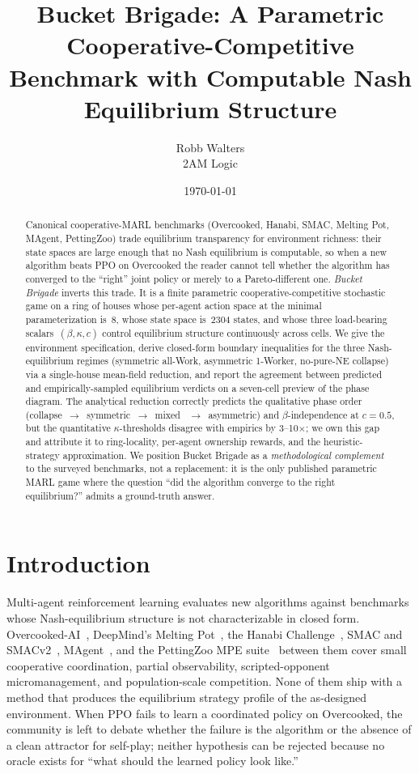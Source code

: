 \documentclass{anvil-paper}
\title{Bucket Brigade: A Parametric Cooperative-Competitive Benchmark with
Computable Nash Equilibrium Structure}
\author{Robb Walters \\ 2AM Logic}
\date{\today}
\begin{document}
\maketitle

\begin{abstract}
Canonical cooperative-MARL benchmarks (Overcooked, Hanabi, SMAC, Melting Pot,
MAgent, PettingZoo) trade equilibrium transparency for environment richness:
their state spaces are large enough that no Nash equilibrium is computable, so
when a new algorithm beats PPO on Overcooked the reader cannot tell whether
the algorithm has converged to the ``right'' joint policy or merely to a
Pareto-different one. \emph{Bucket Brigade} inverts this trade. It is a finite
parametric cooperative-competitive stochastic game on a ring of houses whose
per-agent action space at the minimal parameterization is~$8$, whose state
space is~$2304$ states, and whose three load-bearing scalars~$(\beta,\kappa,c)$
control equilibrium structure continuously across cells. We give the
environment specification, derive closed-form boundary inequalities for the
three Nash-equilibrium regimes (symmetric all-Work, asymmetric 1-Worker,
no-pure-NE collapse) via a single-house mean-field reduction, and report the
agreement between predicted and empirically-sampled equilibrium verdicts on a
seven-cell preview of the phase diagram. The analytical reduction correctly
predicts the qualitative phase order (collapse~$\to$~symmetric~$\to$~mixed
~$\to$~asymmetric) and $\beta$-independence at $c{=}0.5$, but the quantitative
$\kappa$-thresholds disagree with empirics by 3--10$\times$; we own this gap
and attribute it to ring-locality, per-agent ownership rewards, and the
heuristic-strategy approximation. We position Bucket Brigade as a
\emph{methodological complement} to the surveyed benchmarks, not a
replacement: it is the only published parametric MARL game where the question
``did the algorithm converge to the right equilibrium?'' admits a ground-truth
answer.
\end{abstract}

\section{Introduction}
\label{sec:intro}

Multi-agent reinforcement learning evaluates new algorithms against benchmarks
whose Nash-equilibrium structure is not characterizable in closed form.
Overcooked-AI~\citep{overcooked2019}, DeepMind's Melting
Pot~\citep{meltingpot2021}, the Hanabi
Challenge~\citep{hanabi2020}, SMAC and SMACv2~\citep{smac2019,smacv2_2023},
MAgent~\citep{magent2018}, and the PettingZoo MPE
suite~\citep{pettingzoo2021} between them cover small cooperative
coordination, partial observability, scripted-opponent micromanagement, and
population-scale competition. None of them ship with a method that produces
the equilibrium strategy profile of the as-designed environment. When PPO
fails to learn a coordinated policy on Overcooked, the community is left to
debate whether the failure is the algorithm or the absence of a clean
attractor for self-play; neither hypothesis can be rejected because no oracle
exists for ``what should the learned policy look like.''
\end{document}
